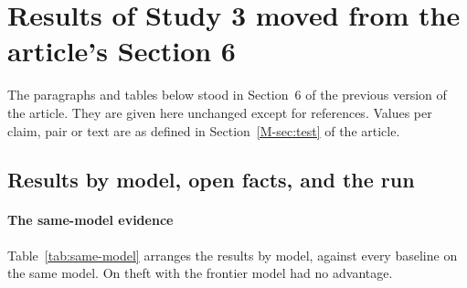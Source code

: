 \section{Results of Study 3 moved from the article's Section 6}
\label{supp:s3-body}
\label{sec:test-results}

The paragraphs and tables below stood in Section~6 of the previous version of the article. They are given here unchanged except for references. Values per claim, pair or text are as defined in Section~\ref{M-sec:test} of the article.

\subsection{Results by model, open facts, and the run}

\paragraph{The same-model evidence}
Table~\ref{tab:same-model} arranges the results by model, \casepath against every baseline on the same model. On theft with the frontier model \casepath had no advantage.

